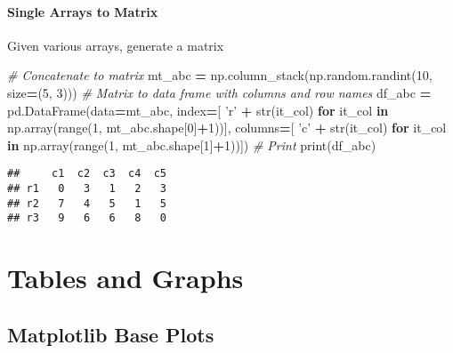 \documentclass[
]{book}
\newenvironment{Shaded}{\begin{snugshade}}{\end{snugshade}}
\newcommand{\BuiltInTok}[1]{#1}
\newcommand{\CommentTok}[1]{\textcolor[rgb]{0.56,0.35,0.01}{\textit{#1}}}
\newcommand{\ControlFlowTok}[1]{\textcolor[rgb]{0.13,0.29,0.53}{\textbf{#1}}}
\newcommand{\DecValTok}[1]{\textcolor[rgb]{0.00,0.00,0.81}{#1}}
\newcommand{\KeywordTok}[1]{\textcolor[rgb]{0.13,0.29,0.53}{\textbf{#1}}}
\newcommand{\NormalTok}[1]{#1}
\newcommand{\OperatorTok}[1]{\textcolor[rgb]{0.81,0.36,0.00}{\textbf{#1}}}
\newcommand{\StringTok}[1]{\textcolor[rgb]{0.31,0.60,0.02}{#1}}
\begin{document}
\hypertarget{single-arrays-to-matrix}{%
\subsubsection{Single Arrays to Matrix}\label{single-arrays-to-matrix}}

Given various arrays, generate a matrix

\begin{Shaded}
\begin{Highlighting}[]
\CommentTok{# Concatenate to matrix}
\NormalTok{mt_abc }\OperatorTok{=}\NormalTok{ np.column_stack(np.random.randint(}\DecValTok{10}\NormalTok{, size}\OperatorTok{=}\NormalTok{(}\DecValTok{5}\NormalTok{, }\DecValTok{3}\NormalTok{)))}
\CommentTok{# Matrix to data frame with columns and row names}
\NormalTok{df_abc }\OperatorTok{=}\NormalTok{ pd.DataFrame(data}\OperatorTok{=}\NormalTok{mt_abc,}
\NormalTok{            index}\OperatorTok{=}\NormalTok{[ }\StringTok{'r'} \OperatorTok{+} \BuiltInTok{str}\NormalTok{(it_col) }\ControlFlowTok{for}\NormalTok{ it_col }\KeywordTok{in}\NormalTok{ np.array(}\BuiltInTok{range}\NormalTok{(}\DecValTok{1}\NormalTok{, mt_abc.shape[}\DecValTok{0}\NormalTok{]}\OperatorTok{+}\DecValTok{1}\NormalTok{))],}
\NormalTok{            columns}\OperatorTok{=}\NormalTok{[ }\StringTok{'c'} \OperatorTok{+} \BuiltInTok{str}\NormalTok{(it_col) }\ControlFlowTok{for}\NormalTok{ it_col }\KeywordTok{in}\NormalTok{ np.array(}\BuiltInTok{range}\NormalTok{(}\DecValTok{1}\NormalTok{, mt_abc.shape[}\DecValTok{1}\NormalTok{]}\OperatorTok{+}\DecValTok{1}\NormalTok{))])}
\CommentTok{# Print}
\BuiltInTok{print}\NormalTok{(df_abc)}
\end{Highlighting}
\end{Shaded}

\begin{verbatim}
##     c1  c2  c3  c4  c5
## r1   0   3   1   2   3
## r2   7   4   5   1   5
## r3   9   6   6   8   0
\end{verbatim}

\hypertarget{tables-and-graphs}{%
\chapter{Tables and Graphs}\label{tables-and-graphs}}

\hypertarget{matplotlib-base-plots}{%
\section{Matplotlib Base Plots}\label{matplotlib-base-plots}}
\end{document}

